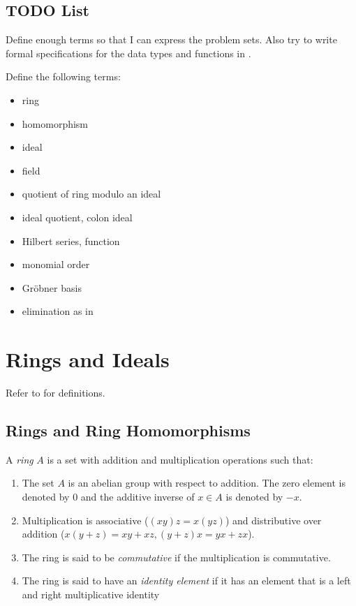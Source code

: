 \documentclass{amsart}
\begin{document}
\subsection{TODO List}

Define enough terms so that I can express the problem sets.
Also try to write formal specifications for the data types and functions in \mzMtwo.

Define the following terms:
\begin{itemize}
	\item ring
	\item homomorphism
	\item ideal
	\item field
	\item quotient of ring modulo an ideal
	\item ideal quotient, colon ideal
	\item Hilbert series, function
	\item monomial order
	\item Gröbner basis
	\item elimination as in \mzMtwo
\end{itemize}

\section{Rings and Ideals}

Refer to \cite[Chapter~1]{atiyah-itca} for definitions.

\subsection{Rings and Ring Homomorphisms}

A \textit{ring} $A$ is a set with addition and multiplication  operations such that:
\begin{enumerate}
\item The set $A$ is an abelian group with respect to addition. 
The zero element is denoted by $0$ and the additive inverse of $x \in A$ is denoted by $-x$.
\item Multiplication is associative ($(xy)z = x(yz)$) and distributive over addition 
($x(y+z) = x y + x z, (y+z)x=yx+zx$).
\item The ring is said to be \textit{commutative} if the multiplication is commutative.
\item The ring is said to have an \textit{identity element} if it has an element that is a left and right multiplicative
identity 
\end{enumerate}
\end{document}
